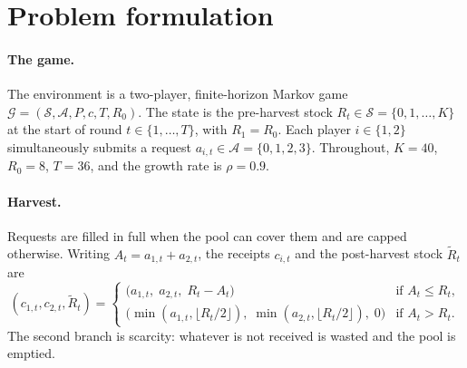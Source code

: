 \section{Problem formulation}
\label{sec:formulation}

\paragraph{The game.}
The environment is a two-player, finite-horizon Markov game
\(\mathcal{G} = (\mathcal{S}, \mathcal{A}, P, c, T, R_0)\).
The state is the pre-harvest stock
\(R_t \in \mathcal{S} = \{0, 1, \dots, K\}\) at the start of round
\(t \in \{1, \dots, T\}\), with \(R_1 = R_0\).
Each player \(i \in \{1, 2\}\) simultaneously submits a request
\(a_{i,t} \in \mathcal{A} = \{0, 1, 2, 3\}\).
Throughout, \(K = 40\), \(R_0 = 8\), \(T = 36\), and the growth rate is
\(\rho = 0.9\).

\paragraph{Harvest.}
Requests are filled in full when the pool can cover them and are capped
otherwise.
Writing \(A_t = a_{1,t} + a_{2,t}\), the receipts \(c_{i,t}\) and the
post-harvest stock \(\tilde{R}_t\) are
\begin{equation}
  (c_{1,t}, c_{2,t}, \tilde{R}_t) =
  \begin{cases}
    \bigl(a_{1,t},\; a_{2,t},\; R_t - A_t\bigr) & \text{if } A_t \le R_t, \\[2pt]
    \bigl(\min(a_{1,t}, \lfloor R_t/2 \rfloor),\;
          \min(a_{2,t}, \lfloor R_t/2 \rfloor),\; 0\bigr) & \text{if } A_t > R_t .
  \end{cases}
  \label{eq:harvest}
\end{equation}
The second branch is scarcity: whatever is not received is wasted and
the pool is emptied.

